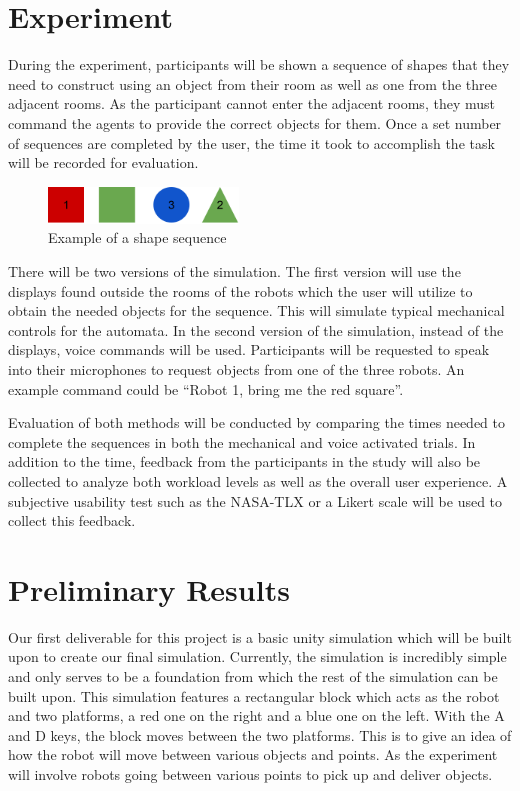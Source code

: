 \documentclass[conference]{IEEEtran}
\begin{document}
\section{Experiment}
During the experiment, participants will be shown a sequence of shapes that they need to construct using an object from their room as well as one from the three adjacent rooms. As the participant cannot enter the adjacent rooms, they must command the agents to provide the correct objects for them. Once a set number of sequences are completed by the user, the time it took to accomplish the task will be recorded for evaluation.  

\begin{figure}[htbp]
\centerline{\includegraphics[width=0.45\textwidth]{sample_sequence.png}}
\caption{Example of a shape sequence}
\label{sample_sequence}
\end{figure}

There will be two versions of the simulation. The first version will use the displays found outside the rooms of the robots which the user will utilize to obtain the needed objects for the sequence. This will simulate typical mechanical controls for the automata. In the second version of the simulation, instead of the displays, voice commands will be used. Participants will be requested to speak into their microphones to request objects from one of the three robots. An example command could be “Robot 1, bring me the red square”.  

Evaluation of both methods will be conducted by comparing the times needed to complete the sequences in both the mechanical and voice activated trials. In addition to the time, feedback from the participants in the study will also be collected to analyze both workload levels as well as the overall user experience. A subjective usability test such as the NASA-TLX or a Likert scale will be used to collect this feedback. 

\section{Preliminary Results}
Our first deliverable 	for this project is a basic unity simulation which will be built upon to create our final simulation. Currently, the simulation is incredibly simple and only serves to be a foundation from which the rest of the simulation can be built upon. This simulation features a rectangular block which acts as the robot and two platforms, a red one on the right and a blue one on the left. With the A and D keys, the block moves between the two platforms. This is to give an idea of how the robot will move between various objects and points. As the experiment will involve robots going between various points to pick up and deliver objects. 
\end{document}
